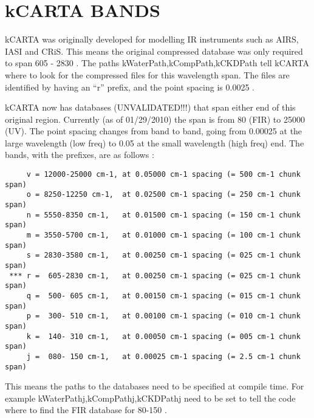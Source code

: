 \documentclass[12pt]{article}
\newcommand{\kc}{\textsf{kCARTA}\xspace}
\begin{document}



\section{\kc BANDS}
\kc was originally developed for modelling IR instruments such as AIRS, IASI and
CRiS. This means the original compressed database was only required to span
605 - 2830 \wn. The paths kWaterPath,kCompPath,kCKDPath tell \kc where to look
for the compressed files for this wavelength span. The files are identified by 
having an ``r'' prefix, and the point spacing is 0.0025 \wn.

\kc now has databases (UNVALIDATED!!!) that span either end of this original
region. Currently (as of 01/29/2010) the span is from 80 \wn (FIR) to 25000 \wn 
(UV). The point spacing changes from band to band, going from 0.00025 \wn at the 
large wavelength (low freq) to 0.05 \wn at the small wavelength (high freq) 
end. The bands, with the prefixes, are as follows  : 

\begin{verbatim}
     v = 12000-25000 cm-1, at 0.05000 cm-1 spacing (= 500 cm-1 chunk span)
     o = 8250-12250 cm-1,  at 0.02500 cm-1 spacing (= 250 cm-1 chunk span)
     n = 5550-8350 cm-1,   at 0.01500 cm-1 spacing (= 150 cm-1 chunk span)
     m = 3550-5700 cm-1,   at 0.01000 cm-1 spacing (= 100 cm-1 chunk span)
     s = 2830-3580 cm-1,   at 0.00250 cm-1 spacing (= 025 cm-1 chunk span)
 *** r =  605-2830 cm-1,   at 0.00250 cm-1 spacing (= 025 cm-1 chunk span)
     q =  500- 605 cm-1,   at 0.00150 cm-1 spacing (= 015 cm-1 chunk span)
     p =  300- 510 cm-1,   at 0.00100 cm-1 spacing (= 010 cm-1 chunk span)
     k =  140- 310 cm-1,   at 0.00050 cm-1 spacing (= 005 cm-1 chunk span)
     j =  080- 150 cm-1,   at 0.00025 cm-1 spacing (= 2.5 cm-1 chunk span)
\end{verbatim}

This means the paths to the databases need to be specified at compile time.
For example kWaterPathj,kCompPathj,kCKDPathj need to be set to tell the code
where to find the FIR database for 80-150 \wn. 
\end{document}
